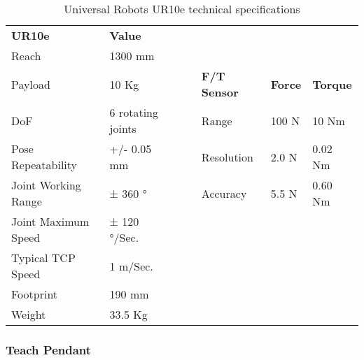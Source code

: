 \begin{table}[]
    \centering
    \begin{tabular}{|l|l|lllll}
    \cline{1-2}
    \textbf{UR10e} & \textbf{Value} &  &  &  &  &  \\ \cline{1-2}
    Reach & 1300 mm &  &  &  &  &  \\ \cline{1-2} \cline{5-7} 
    Payload & 10 Kg &  & \multicolumn{1}{l|}{} & \multicolumn{1}{l|}{\textbf{F/T Sensor}} & \multicolumn{1}{l|}{\textbf{Force}} & \multicolumn{1}{l|}{\textbf{Torque}} \\ \cline{1-2} \cline{5-7} 
    DoF & 6 rotating joints &  & \multicolumn{1}{l|}{} & \multicolumn{1}{l|}{Range} & \multicolumn{1}{l|}{100 N} & \multicolumn{1}{l|}{10 Nm} \\ \cline{1-2} \cline{5-7} 
    Pose Repeatability & +/- 0.05 mm &  & \multicolumn{1}{l|}{} & \multicolumn{1}{l|}{Resolution} & \multicolumn{1}{l|}{2.0 N} & \multicolumn{1}{l|}{0.02 Nm} \\ \cline{1-2} \cline{5-7} 
    Joint Working Range & ± 360 ° &  & \multicolumn{1}{l|}{} & \multicolumn{1}{l|}{Accuracy} & \multicolumn{1}{l|}{5.5 N} & \multicolumn{1}{l|}{0.60 Nm} \\ \cline{1-2} \cline{5-7} 
    Joint Maximum Speed & ± 120 °/Sec. &  &  &  &  &  \\ \cline{1-2}
    Typical TCP Speed & 1 m/Sec. &  &  &  &  &  \\ \cline{1-2}
    Footprint & 190 mm &  &  &  &  &  \\ \cline{1-2}
    Weight & 33.5 Kg &  &  &  &  &  \\ \cline{1-2}
    \end{tabular}
    \caption{Universal Robots UR10e technical specifications}
    \label{tab:ur10e-specs}
\end{table}

\subsubsection{Teach Pendant}

